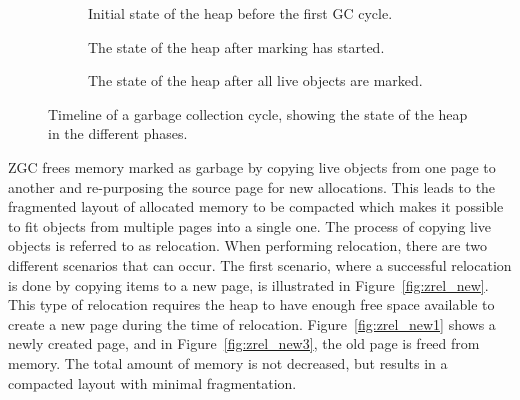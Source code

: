 \begin{figure}[H]
    \centering
    \begin{subfigure}[t]{.214\textwidth}
        \centering
        
        \caption{Initial state of the heap before the first GC cycle.}
        \label{fig:zrel1}
    \end{subfigure}
    \hfill\vline\hfill
    \begin{subfigure}[t]{.32\textwidth}
        \centering
        
        \caption{The state of the heap after marking has started.}
        \label{fig:zrel2}
    \end{subfigure}
    \hfill\vline\hfill
    \begin{subfigure}[t]{.32\textwidth}
        \centering
        
        \caption{The state of the heap after all live objects are marked.}
        \label{fig:zrel3}
    \end{subfigure}
    \caption{Timeline of a garbage collection cycle, showing the state of the heap in the different phases.}
    \label{fig:zgc_timeline}
\end{figure}

\vspace*{-0.49cm}

ZGC frees memory marked as garbage by copying live objects from one page to another and re-purposing the source page for new allocations. This leads to the fragmented layout of allocated memory to be compacted which makes it possible to fit objects from multiple pages into a single one. The process of copying live objects is referred to as relocation. When performing relocation, there are two different scenarios that can occur. The first scenario, where a successful relocation is done by copying items to a new page, is illustrated in Figure~\ref{fig:zrel_new}. This type of relocation requires the heap to have enough free space available to create a new page during the time of relocation. Figure~\ref*{fig:zrel_new1} shows a newly created page, and in Figure~\ref*{fig:zrel_new3}, the old page is freed from memory. The total amount of memory is not decreased, but results in a compacted layout with minimal fragmentation.

